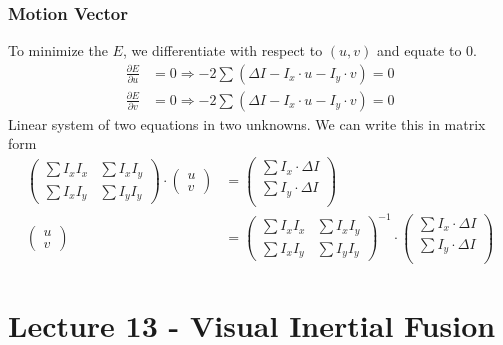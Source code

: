 \documentclass[a4paper,12 pt]{article}
\theoremstyle{definition}
\theoremstyle{remark}
\theoremstyle{definition}
\theoremstyle{definition}
\theoremstyle{definition}
\theoremstyle{remark}
\theoremstyle{definition}
\begin{document}
\subsubsection*{Motion Vector}
To minimize the $E$, we differentiate with respect to $(u,v)$ and equate to 0.
\begin{equation}
\begin{split}
\frac{\partial E}{\partial u}&=0 \Rightarrow -2 \sum(\Delta I-I_x\cdot u - I_y \cdot v)=0\\
\frac{\partial E}{\partial v}&=0 \Rightarrow -2 \sum(\Delta I-I_x\cdot u - I_y \cdot v)=0
\end{split}
\end{equation}
Linear system of two equations in two unknowns. We can write this in matrix form
\begin{equation}
\begin{split}
\begin{pmatrix}
\sum I_xI_x & \sum I_x I_y\\
\sum I_xI_y & \sum I_y I_y
\end{pmatrix} \cdot \begin{pmatrix}
u\\ v 
 \end{pmatrix}&= \begin{pmatrix}
 \sum I_x \cdot \Delta I\\
  \sum I_y \cdot \Delta I\\
 \end{pmatrix}\\
 \begin{pmatrix}
u\\ v 
 \end{pmatrix}&=\begin{pmatrix}
\sum I_xI_x & \sum I_x I_y\\
\sum I_xI_y & \sum I_y I_y
\end{pmatrix} ^{-1}\cdot \begin{pmatrix}
 \sum I_x \cdot \Delta I\\
  \sum I_y \cdot \Delta I\\
 \end{pmatrix}
 \end{split}
\end{equation}
\newpage
\section*{Lecture 13 - Visual Inertial Fusion}
\end{document}
